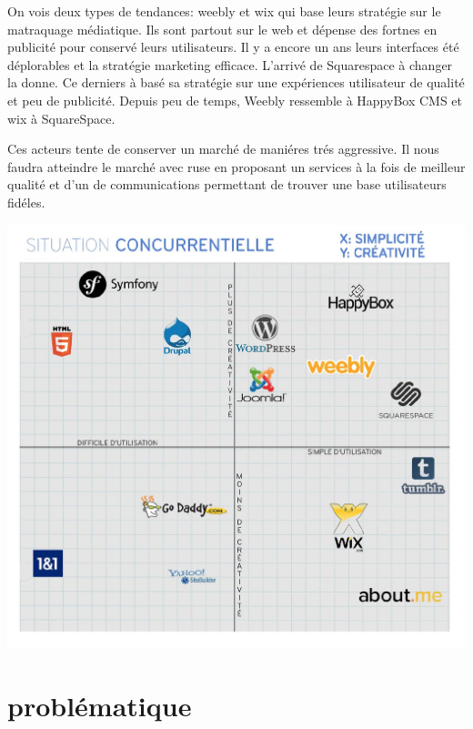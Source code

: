 \documentclass[11pt, a4paper ]{article}
\let\stdsection\section
\renewcommand\section{\newpage\stdsection}
\begin{document}
\begin{spacing}{1.5}
On vois deux types de tendances: weebly et wix qui base leurs stratégie sur le matraquage médiatique. Ils sont partout sur le web et dépense des fortnes en publicité pour conservé leurs utilisateurs. Il y a encore un ans leurs interfaces été déplorables et la stratégie marketing efficace.
L'arrivé de Squarespace à changer la donne. Ce derniers à basé sa stratégie sur une expériences utilisateur de qualité et peu de publicité. Depuis peu de temps, Weebly ressemble à HappyBox CMS et wix à SquareSpace.

Ces acteurs tente de conserver un marché de maniéres trés aggressive. Il nous faudra atteindre le marché avec ruse en proposant un services à la fois de meilleur qualité et d'un de communications permettant de trouver une base utilisateurs fidéles.

\begin{center}
	\includegraphics[width=\textwidth]{images/media/concurenceHBCMS}
\end{center}



		\section{problématique} %


\end{spacing}
\end{document}
